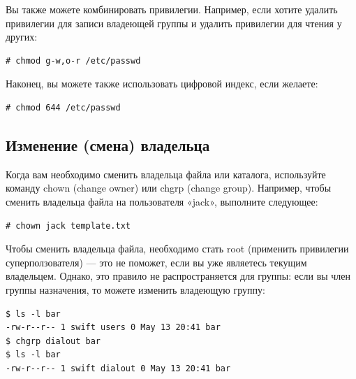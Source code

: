 \documentclass[10pt]{book}
\begin{document}
Вы также можете комбинировать привилегии. Например, если хотите удалить привилегии для записи владеющей группы и удалить привилегии для чтения у других:

\vspace{3mm}
\begin{tcolorbox}
\begin{lstlisting}
# chmod g-w,o-r /etc/passwd
\end{lstlisting}
\end{tcolorbox}

Наконец, вы можете также использовать цифровой индекс, если желаете:

\vspace{3mm}
\begin{tcolorbox}
\begin{lstlisting}
# chmod 644 /etc/passwd
\end{lstlisting}
\end{tcolorbox}

\subsection{Изменение (смена) владельца}

Когда вам необходимо сменить владельца файла или каталога, используйте команду chown (change owner) или chgrp (change group). Например, чтобы сменить владельца файла на пользователя «jack», выполните следующее:

\vspace{3mm}
\begin{tcolorbox}
\begin{lstlisting}
# chown jack template.txt
\end{lstlisting}
\end{tcolorbox}

Чтобы сменить владельца файла, необходимо стать root (применить привилегии суперползователя) — это не поможет, если вы уже являетесь текущим владельцем. Однако, это правило не распространяется для группы: если вы член группы назначения, то можете изменить владеющую группу:

\vspace{3mm}
\begin{tcolorbox}
\begin{lstlisting}
$ ls -l bar
-rw-r--r-- 1 swift users 0 May 13 20:41 bar
$ chgrp dialout bar
$ ls -l bar
-rw-r--r-- 1 swift dialout 0 May 13 20:41 bar
\end{lstlisting}
\end{tcolorbox}
\end{document}
